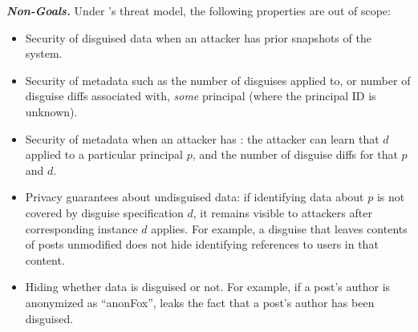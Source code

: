 \vspace{6pt}\noindent\textbf{\emph{Non-Goals.}}
%
Under \sys's threat model, the following properties are out of scope:
%
\begin{itemize}
    \item Security of disguised data when an attacker has prior snapshots of the system.
    \item Security of metadata such as the number of disguises applied to, or number of
        disguise diffs associated with, \emph{some} principal (where the principal
        ID is unknown).
    \item Security of metadata when an attacker has : the attacker can learn that $d$
        applied to a particular principal $p$, and the number of disguise diffs for that $p$ and $d$.
    \item Privacy guarantees about undisguised data: if identifying data about $p$ is not covered by
        disguise specification $d$, it remains visible to attackers after corresponding instance $d$ applies.
        For example, a disguise that leaves contents of posts unmodified does not hide identifying references
	to users in that content.
    \item Hiding whether data is disguised or not. For example, if a post's author is anonymized as ``anonFox'',
        \sys leaks the fact that a post's author has been disguised.
\end{itemize}

